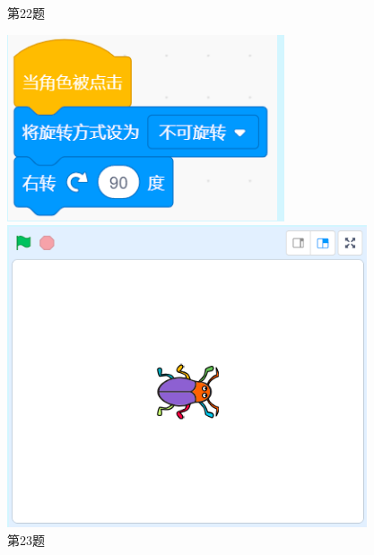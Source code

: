 \documentclass[10pt, a4paper]{article}
\begin{document}
\begin{enumerate}
\begin{figure}[htbp]
\begin{minipage}[t]{.2\textwidth}
                \caption*{第22题}
            \end{minipage}
            \begin{minipage}[t]{.3\textwidth}
                \centering
                \begin{minipage}[t]{.48\textwidth}
                    \centering
                    \includegraphics[width=\textwidth]{23-1.png}
                \end{minipage}
                \begin{minipage}[t]{.4\textwidth}
                    \centering
                    \includegraphics[width=\textwidth]{23-2.png}
                \end{minipage}
                \caption*{第23题}
            \end{minipage}
        \end{figure}


\end{enumerate}
\end{document}
